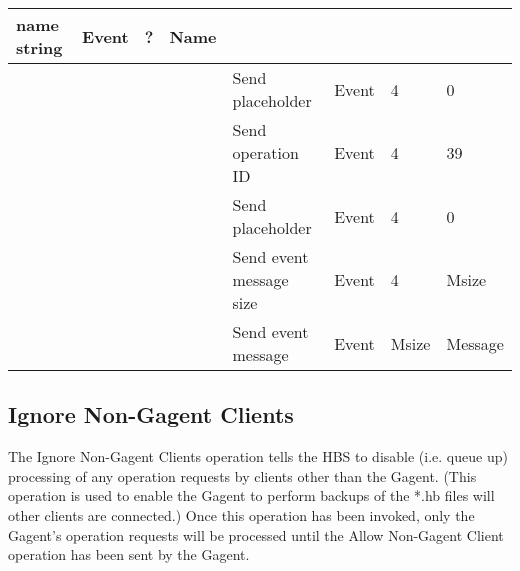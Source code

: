 \begin{tabular}{|p{1.2in}|p{.4in}|p{.4in}|p{.5in}|p{1.2in}|p{.4in}|p{.4in}|p{.5in} |}
                                             name string  & Event  &  ?    & Name  \\ \hline
                  &        &       &       & Send placeholder  & Event  &   4   &   0    \\  \hline
                  &        &       &       & Send operation 
                                             ID           & Event  &   4   &  39   \\ \hline
                  &        &       &       & Send placeholder     & Event  &   4   &  0    \\ \hline
                  &        &       &       & Send event message
                                                  size    & Event  &   4   &  Msize \\ \hline
                  &        &       &       & Send event message
                                                          & Event  & Msize & Message  \\ \hline
\end{tabular}
\normalsize
\bigskip



\newpage
\subsection{Ignore Non-Gagent Clients}

The Ignore Non-Gagent Clients operation tells the HBS to disable
(i.e. queue up) processing of any operation requests by clients other than
the Gagent.  (This operation is used to enable the Gagent to perform
backups of the *.hb files will other clients are connected.)  Once this
operation has been invoked, only the Gagent's operation requests will be
processed until the Allow Non-Gagent Client operation has been sent by the
Gagent.


